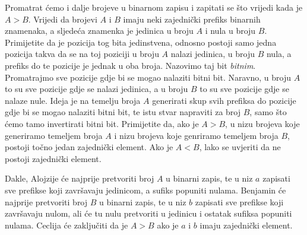 Promatrat ćemo i dalje brojeve u binarnom zapisu i zapitati se što vrijedi kada
je $A > B$. Vrijedi da brojevi $A$ i $B$ imaju neki zajednički prefiks binarnih
znamenaka, a sljedeća znamenka je jedinica u broju $A$ i nula u broju $B$.
Primijetite da je pozicija tog bita jedinstvena, odnosno postoji samo jedna
pozicija takva da se na toj poziciji u broju $A$ nalazi jedinica, u broju $B$
nula, a prefiks do te pozicije je jednak u oba broja. Nazovimo taj bit
\textit{bitnim}. Promatrajmo sve pozicije gdje bi se mogao nalaziti bitni bit.
Naravno, u broju $A$ to su sve pozicije gdje se nalazi jedinica, a u broju $B$
to su sve pozicije gdje se nalaze nule. Ideja je na temelju broja $A$ generirati
skup svih prefiksa do pozicije gdje bi se mogao nalaziti bitni bit, te istu stvar
napraviti za broj $B$, samo što ćemo tamo invertirati bitni bit. Primijetite da,
ako je $A > B$, u nizu brojeva koje generiramo temeljem broja $A$ i nizu brojeva
koje genriramo temeljem broja $B$, postoji točno jedan zajednički element. Ako je
$A < B$, lako se uvjeriti da ne postoji zajednički element.

Dakle, Alojzije će najprije pretvoriti broj $A$ u binarni zapis, te u niz $a$
zapisati sve prefikse koji završavaju jedinicom, a sufiks popuniti nulama.
Benjamin će najprije pretvoriti broj $B$ u binarni zapis, te u niz $b$ zapisati
sve prefikse koji završavaju nulom, ali će tu nulu pretvoriti u jedinicu i ostatak
sufiksa popuniti nulama. Ceclija će zaključiti da je $A > B$ ako je $a$ i $b$
imaju zajednički element.
